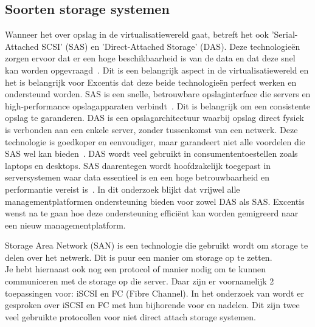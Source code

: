 \subsection{Soorten storage systemen}\label{subsec:storage}
Wanneer het over opslag in de virtualisatiewereld gaat, betreft het ook 'Serial-Attached SCSI' (SAS) en 'Direct-Attached Storage' (DAS). Deze technologieën zorgen ervoor dat er een hoge beschikbaarheid is van de data en dat deze snel kan worden opgevraagd~\autocite{griswold2002storage}. Dit is een belangrijk aspect in de virtualisatiewereld en het is belangrijk voor Excentis dat deze beide technologieën perfect werken en ondersteund worden.
SAS is een snelle, betrouwbare opslaginterface die servers en high-performance opslagapparaten verbindt~\autocite{aravindan2014performance}. Dit is belangrijk om een consistente opslag te garanderen. DAS is een opslagarchitectuur waarbij opslag direct fysiek is verbonden aan een enkele server, zonder tussenkomst van een netwerk. Deze technologie is goedkoper en eenvoudiger, maar garandeert niet alle voordelen die SAS wel kan bieden~\autocite{griswold2002storage}.
DAS wordt veel gebruikt in consumententoestellen zoals laptops en desktops. SAS daarentegen wordt hoofdzakelijk toegepast in serversystemen waar data essentieel is en een hoge betrouwbaarheid en performantie vereist is~\autocite{griswold2002storage}.
In dit onderzoek blijkt dat vrijwel alle managementplatformen ondersteuning bieden voor zowel DAS als SAS. Excentis wenst na te gaan hoe deze ondersteuning efficiënt kan worden gemigreerd naar een nieuw managementplatform.

Storage Area Network (SAN) \textcite{ibm2025san} is een technologie die gebruikt wordt om storage te delen over het netwerk.
Dit is puur een manier om storage op te zetten. \\
Je hebt hiernaast ook nog een protocol of manier nodig om te kunnen communiceren met de storage op die server.
Daar zijn er voornamelijk 2 toepassingen voor: iSCSI en FC (Fibre Channel).
In het onderzoek van \textcite{stonefly2023fcvsiscsi} wordt er gesproken over iSCSI en FC met hun bijhorende voor en nadelen. Dit zijn twee veel gebruikte protocollen voor niet direct attach storage systemen.

